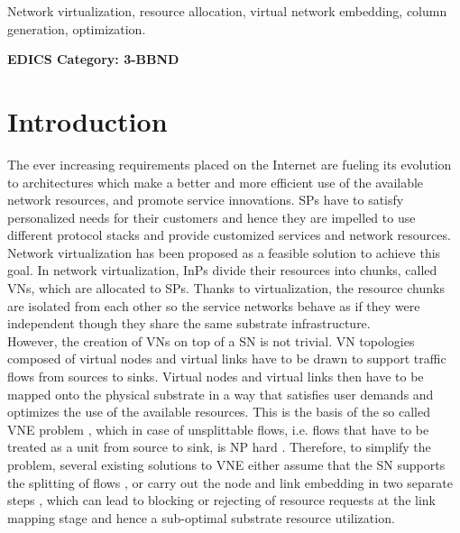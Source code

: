 \documentclass[journal]{IEEEtran}
\begin{document}
\begin{IEEEkeywords}
Network virtualization, resource allocation, virtual network embedding, column generation, optimization.
\end{IEEEkeywords}


 \ifCLASSOPTIONpeerreview
 \begin{center} \bfseries EDICS Category: 3-BBND \end{center}
 \fi

\IEEEpeerreviewmaketitle


\section{Introduction}

The ever increasing requirements placed on the Internet are fueling its evolution to architectures which make a better and more efficient use of the available network resources, and promote service innovations. \acp{SP} have to satisfy personalized needs for their customers and hence they are impelled to use different protocol stacks and provide customized services and network resources. Network virtualization \cite{Fischer13} has been proposed as a feasible solution to achieve this goal. In network virtualization, \acp{InP} divide their resources into chunks, called \acp{VN}, which are allocated to \acp{SP}. Thanks to virtualization, the resource chunks are isolated from each other so the service networks behave as if they were independent though they share the same substrate infrastructure.\\
\indent However, the creation of \acp{VN} on top of a \ac{SN} is not trivial. \ac{VN} topologies composed of virtual nodes and virtual links have to be drawn to support traffic flows from sources to sinks. Virtual nodes and virtual links then have to be mapped onto the physical substrate in a way that satisfies user demands and optimizes the use of the available resources. This is the basis of the so called \ac{VNE} problem \cite{Fischer13}, which in case of unsplittable flows, i.e. flows that have to be treated as a unit from source to sink, is NP hard \cite{Chowdhury12}. Therefore, to simplify the problem, several existing solutions to VNE either assume that the \ac{SN} supports the splitting of flows \cite{Yu08}, or carry out the node and link embedding in two separate steps \cite{Zhu06}, which can lead to blocking or rejecting of resource requests at the link mapping stage and hence a sub-optimal substrate resource utilization.\\
\end{document}
